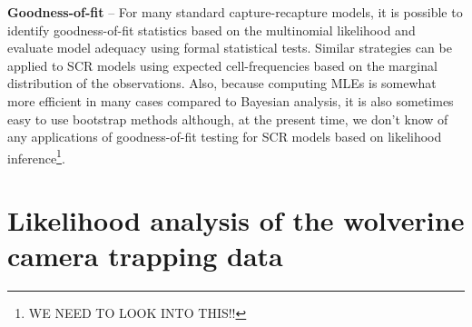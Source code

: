 {\bf Goodness-of-fit} -- For many standard capture-recapture models,
it is possible to identify goodness-of-fit statistics based on the
multinomial likelihood and evaluate model adequacy using formal
statistical tests. Similar strategies can be applied to SCR models
using expected cell-frequencies based on the marginal distribution of
the observations. Also, because computing MLEs is somewhat more
efficient in many cases compared to Bayesian analysis, it is also
sometimes easy to use bootstrap methods although, at the present time,
we don't know of any applications of goodness-of-fit testing for SCR
models based on likelihood inference\footnote{WE NEED TO LOOK INTO THIS!!}.




\section{Likelihood analysis of the wolverine camera trapping data}
\label{mle.sec.wolverine}


